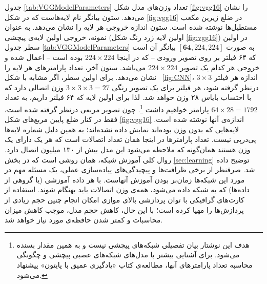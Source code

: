 \documentclass[11pt, twoside]{imsproc}
\let\LTRfootnote\footnoteA
\begin{document}
جدول
\ref{tab:VGGModelParameters}
تعداد وزن‌های مدل شکل
\ref{fig:vgg16}
  را نشان می‌دهد.
ستون
بیانگر نام لایه‌هاست که در شکل
\ref{fig:vgg16}
در ضلع زیرین مکعب مستطیل‌ها نوشته شده است.
ستون
اندازه
خروجی هر لایه را نشان می‌دهد.
به عنوان نمونه، خروجی اولین لایه‌ی پیچشی (اولین لایه زرد رنگ شکل
\ref{fig:vgg16})
در اولین سطر جدول
\ref{tab:VGGModelParameters}
به صورت
$[\mathbf{64}, 224, 224]$
بیانگر آن است که ۶۴ فیلتر بر روی تصویر ورودی -- که در اینجا
$224\times224$
 بوده است -- اعمال شده و خروجی هر کدام یک تصویر
$224\times224$
می‌باشد.
ستون آخر، تعداد پارامترهای هر لایه را نشان می‌دهد.
برای اولین سطر،
اگر مشابه با شکل
~\ref{fig:CNN}،
اندازه هر فیلتر
$3\times3$
  درنظر گرفته شود، هر فیلتر برای یک تصویر رنگی
$3\times3\times3=27$
وزن اتصالی دارد که با احتساب بایاس ۲۸ وزن خواهد شد. لذا برای اولین لایه که ۶۴ فیلتر داریم، به تعداد
$64\times28=1792$
پارامتر خواهیم داشت%
\footnote{
هدف این نوشتار بیان تفصیلی شبکه‌های پیچشی نیست و به همین مقدار بسنده می‌شود.
برای آشنایی بیشتر با مدل‌های شبکه‌های عصبی پیچشی و چگونگی محاسبه تعداد پارامترهای آنها، مطالعه‌ی کتاب «یادگیری عمیق با پایتون»
\cite{franoischollet2017learning}
پیشنهاد می‌شود.
}.
چون تصویر مربعی درنظر گرفته شده است،
فقط در کنار ضلع پایین مربع‌های شکل
\ref{fig:vgg16}
اندازه‌ی آنها نوشته شده است.
  لایه‌هایی که بدون وزن بوده‌اند نمایش داده نشده‌اند؛ به همین دلیل شماره لایه‌ها پی‌درپی نیست.
تعداد پارامترها در اینجا همان تعداد اتصالات است که هر یک دارای یک وزن هستند
همان‌‌گونه که ملاحظه می‌شود این مدل بیش از ۱۳۰ میلیون اتصال دارد.
روال کلی آموزش شبکه،‌ همان روشی است که در بخش
\ref{sec:learning}
توضیح داده شد.
صرفنظر از برخی ظرافت‌ها و پیچیدگی‌های پیاده‌سازی عملی، یک مسئله مهم در مورد این شبکه‌ها زمان‌بر بودن آموزش آنهاست. با هر داده آموزشی (یا گروهی از داده‌ها) که به شبکه داده می‌شود، همه‌ی وزن‌ اتصالات باید بهنگام شوند. استفاده از کارت‌های گرافیکی با توان پردازشی بالای موازی امکان انجام چنین حجم زیادی از پردازش‌ها را مهیا کرده است؛
با این حال، کاهش حجم مدل، موجب کاهش میزان محاسبات و کمتر شدن حافظه‌ی مورد نیاز خواهد شد.
%

\end{document}
